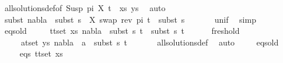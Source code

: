 \begin{isabellebody}
\ all{\isacharunderscore}{\kern0pt}solutions{\isacharunderscore}{\kern0pt}def{\isacharbrackleft}{\kern0pt}of\ {\isacartoucheopen}{\isacharparenleft}{\kern0pt}{\isacharparenleft}{\kern0pt}Susp\ pi\ X{\isacharcomma}{\kern0pt}\ t{\isacharprime}{\kern0pt}{\isacharparenright}{\kern0pt}\ {\isacharhash}{\kern0pt}\ xs{\isacharcomma}{\kern0pt}\ ys{\isacharparenright}{\kern0pt}{\isacartoucheclose}{\isacharbrackright}{\kern0pt}\ \isamarkupfalse%
\ auto\isanewline
\ \ \ \isamarkupfalse%
\ subst{\isacharcolon}{\kern0pt}\ {\isachardoublequoteopen}nabla{}\ {\isasymTurnstile}\ subst\ {\isacharparenleft}{\kern0pt}s{}\ {\isasymbullet}\ {\isacharbrackleft}{\kern0pt}{\isacharparenleft}{\kern0pt}X{\isacharcomma}{\kern0pt}\ swap\ {\isacharparenleft}{\kern0pt}rev\ pi{\isacharparenright}{\kern0pt}\ t{\isacharprime}{\kern0pt}{\isacharparenright}{\kern0pt}{\isacharbrackright}{\kern0pt}{\isacharparenright}{\kern0pt}\ {\isasymapprox}\ subst\ s{}{\isachardoublequoteclose}\isanewline
\ \ \ \ \ \isamarkupfalse%
\ unif{\isacharunderscore}{\kern0pt}{}\ \isamarkupfalse%
\ simp\isanewline
\isanewline
\ \ \ \isamarkupfalse%
\ {}\isanewline
\ \ \ \isamarkupfalse%
\ eqs{\isacharunderscore}{\kern0pt}old{\isacharcolon}{\kern0pt}\isanewline
\ \ \ \ \ {\isachardoublequoteopen}{\isasymforall}{\isacharparenleft}{\kern0pt}t{}{\isacharcomma}{\kern0pt}t{}{\isacharparenright}{\kern0pt}{\isasymin}set\ xs{\isachardot}{\kern0pt}\ nabla{}\ {\isasymturnstile}\ subst\ s{}\ t{}\ {\isasymapprox}\ subst\ s{}\ t{}{\isachardoublequoteclose}\isanewline
\ \ \ \ \ \ fresh{\isacharunderscore}{\kern0pt}old{\isacharcolon}{\kern0pt}\isanewline
\ \ \ \ \ {\isachardoublequoteopen}{\isasymforall}{\isacharparenleft}{\kern0pt}a{\isacharcomma}{\kern0pt}t{\isacharparenright}{\kern0pt}{\isasymin}set\ ys{\isachardot}{\kern0pt}\ nabla{}\ {\isasymturnstile}\ a\ {\isasymsharp}\ subst\ s{}\ t{\isachardoublequoteclose}\isanewline
\ \ \ \ \ \isamarkupfalse%
\ all{\isacharunderscore}{\kern0pt}solutions{\isacharunderscore}{\kern0pt}def\ \isamarkupfalse%
\ auto\isanewline
\isanewline
\ \ \ \isamarkupfalse%
\ eqs{\isacharunderscore}{\kern0pt}old\ \isanewline
\ \ \ \isamarkupfalse%
\ eqs{\isacharcolon}{\kern0pt}\ {\isachardoublequoteopen}{\isasymforall}{\isacharparenleft}{\kern0pt}t{}{\isacharcomma}{\kern0pt}t{}{\isacharparenright}{\kern0pt}{\isasymin}set\ xs{\isachardot}{\kern0pt}\ \isanewline

\end{isabellebody}
